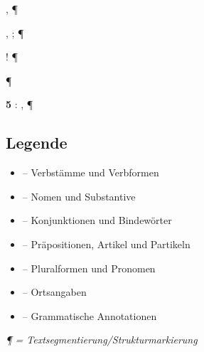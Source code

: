 \documentclass[12pt]{../../inc/mybib}
\begin{document}
\hspace*{2cm}     , ¶

\hspace*{2cm}     ,    ; ¶

\hspace*{3cm}       ! ¶

¶

\textbf{5}     :  , ¶

\vspace{2em}

\subsection*{Legende}

\begin{itemize}
    \item {} -- Verbstämme und Verbformen
    \item {} -- Nomen und Substantive
    \item {} -- Konjunktionen und Bindewörter
    \item {} -- Präpositionen, Artikel und Partikeln
    \item {} -- Pluralformen und Pronomen
    \item {} -- Ortsangaben
    \item {} -- Grammatische Annotationen
\end{itemize}

\vspace{1em}
\textit{¶ = Textsegmentierung/Strukturmarkierung}
\end{document}
